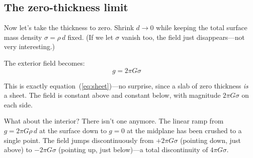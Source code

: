 \documentclass[11pt, letterpaper]{article}
\begin{document}
\subsection{The zero-thickness limit}

Now let's take the thickness to zero. Shrink $d \to 0$ while keeping the total surface mass density $\sigma = \rho\, d$ fixed. (If we let $\sigma$ vanish too, the field just disappears---not very interesting.)

The exterior field becomes:
\begin{equation}
  g = 2\pi G \sigma
\end{equation}

This is exactly equation~(\ref{eq:sheet})---no surprise, since a slab of zero thickness \textit{is} a sheet. The field is constant above and constant below, with magnitude $2\pi G\sigma$ on each side.

What about the interior? There isn't one anymore. The linear ramp from $g = 2\pi G \rho\, d$ at the surface down to $g = 0$ at the midplane has been crushed to a single point. The field jumps discontinuously from $+2\pi G \sigma$ (pointing down, just above) to $-2\pi G \sigma$ (pointing up, just below)---a total discontinuity of $4\pi G \sigma$.

\end{document}
